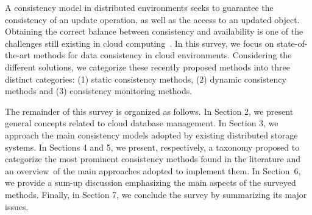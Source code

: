 A consistency model in distributed environments seeks to guarantee the consistency of an update operation, as well as the access to an updated object. Obtaining the correct balance between consistency and availability is one of the challenges still existing in cloud computing~\cite{Elbushra:2014}. In this survey, we focus on state-of-the-art  methods for data consistency in cloud environments. Considering the different solutions, we categorize these recently proposed methods into three %
distinct categories: (1) static consistency methods, (2) dynamic consistency methods and (3) consistency monitoring methods.

The remainder of this survey is organized as follows. In Section 2, we present general concepts related to cloud database management. In Section 3, we approach the main consistency models adopted by existing distributed storage systems. 
In Sections 4 and 5, we present, respectively, a taxonomy proposed to categorize the most prominent consistency methods found in the literature and an overview~of the main approaches adopted to implement them. In Section~6, we provide a sum-up discussion emphasizing the main aspects of the surveyed methods.
Finally, in Section 7, we conclude the survey by summarizing its major issues.
\vspace{2mm}